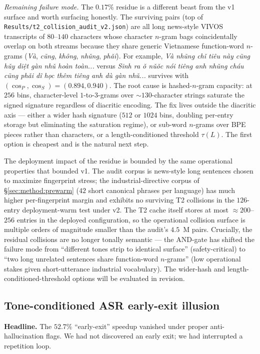 \documentclass[a4paper,fleqn]{cas-dc}
\begin{document}
\emph{Remaining failure mode.} The $0.17\%$ residue is a different beast from the v1 surface and worth surfacing honestly. The surviving pairs (top of \texttt{Results/t2\_collision\_audit\_v2.json}) are all long news-style VIVOS transcripts of $80$--$140$ characters whose character $n$-gram bags coincidentally overlap on both streams because they share generic Vietnamese function-word $n$-grams (\emph{V\`a}, \emph{c\~ung}, \emph{kh\^ong}, \emph{nh\v{u}ng}, \emph{ph\v{a}i}). For example, \emph{V\`a nh\~ung ch\v{i} ti\^eu n\`ay c\~ung h\v{u}y di\d{\^e}t g\`an nh\v{u} ho\`an to\`an...} versus \emph{Sinh ra \v{o} n\v{u}\v{o}c n\'oi ti\^eng anh nh\v{u}ng ch\'au c\~ung ph\v{a}i d\^i h\d{o}c th\^em ti\^eng anh d\`u g\`an nh\v{u}...} survives with $(\cos_{P}, \cos_{S}) = (0.894, 0.940)$. The root cause is hashed-$n$-gram capacity: at $256$ bins, character-level $1$-to-$3$-grams over $\sim 130$-character strings saturate the signed signature regardless of diacritic encoding. The fix lives outside the diacritic axis --- either a wider hash signature ($512$ or $1024$ bins, doubling per-entry storage but eliminating the saturation regime), or sub-word $n$-grams over BPE pieces rather than characters, or a length-conditioned threshold $\tau(L)$. The first option is cheapest and is the natural next step.

The deployment impact of the residue is bounded by the same operational properties that bounded v1. The audit corpus is news-style long sentences chosen to maximize fingerprint stress; the industrial-directive corpus of \S\ref{sec:method:prewarm} ($42$ short canonical phrases per language) has much higher per-fingerprint margin and exhibits no surviving T2 collisions in the $126$-entry deployment-warm test under v2. The T2 cache itself stores at most $\approx 200$--$256$ entries in the deployed configuration, so the operational collision surface is multiple orders of magnitude smaller than the audit's $4.5$~M pairs. Crucially, the residual collisions are no longer tonally semantic --- the AND-gate has shifted the failure mode from ``different tones strip to identical surface'' (safety-critical) to ``two long unrelated sentences share function-word $n$-grams'' (low operational stakes given short-utterance industrial vocabulary). The wider-hash and length-conditioned-threshold options will be evaluated in revision.

\subsection{Tone-conditioned ASR early-exit illusion}\label{sec:lim:earlyexit}
\textbf{Headline.} The $52.7\%$ ``early-exit'' speedup vanished under proper anti-hallucination flags. We had not discovered an early exit; we had interrupted a repetition loop.
\end{document}
